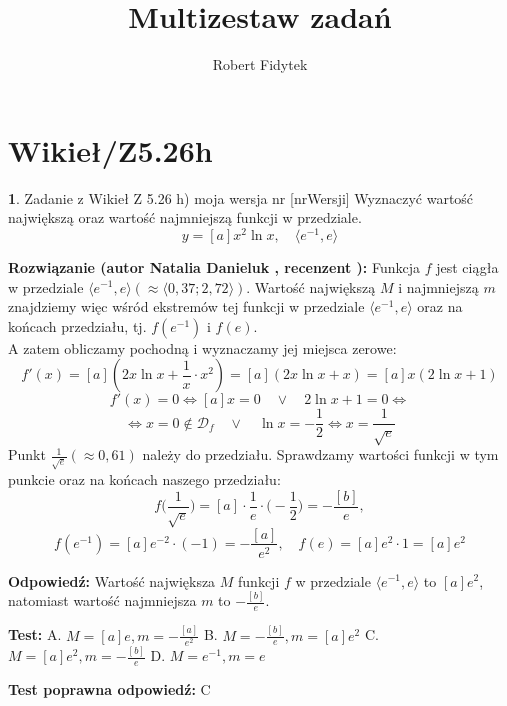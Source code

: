 \documentclass[12pt, a4paper]{article}
\title{Multizestaw zadań}
\author{Robert Fidytek}
\date{}
\theoremstyle{definition} %
\newtheorem{zad}{}
\newcommand{\kategoria}[1]{\section{#1}} %
\newcommand{\zadStart}[1]{\begin{zad}#1\newline} %
\newcommand{\zadStop}{\end{zad}}   %
\newcommand{\rozwStart}[2]{\noindent \textbf{Rozwiązanie (autor #1 , recenzent #2): }\newline} %
\newcommand{\rozwStop}{\newline}                                            %
\newcommand{\odpStart}{\noindent \textbf{Odpowiedź:}\newline}    %
\newcommand{\odpStop}{\newline}                                             %
\newcommand{\testStart}{\noindent \textbf{Test:}\newline} %
\newcommand{\testStop}{\newline} %
\newcommand{\kluczStart}{\noindent \textbf{Test poprawna odpowiedź:}\newline} %
\newcommand{\kluczStop}{\newline} %
\begin{document}
\maketitle

\kategoria{Wikieł/Z5.26h}

\zadStart{Zadanie z Wikieł Z 5.26 h) moja wersja nr [nrWersji]}
Wyznaczyć wartość największą oraz wartość najmniejszą funkcji w przedziale. 
$$y = [a]x^2 \ln x, \quad \langle e^{-1},e\rangle$$
\zadStop

\rozwStart{Natalia Danieluk}{}
Funkcja $f$ jest ciągła w przedziale $\langle e^{-1},e \rangle (\approx \langle 0,37;2,72 \rangle)$. Wartość największą $M$ i najmniejszą $m$ znajdziemy więc wśród ekstremów tej funkcji w przedziale $\langle e^{-1},e \rangle$ oraz na końcach przedziału, tj. $f(e^{-1})$ i $f(e)$. \\
A zatem obliczamy pochodną i wyznaczamy jej miejsca zerowe:
$$ f'(x) = [a](2x \ln x + \frac{1}{x} \cdot x^2) = [a](2x \ln x + x)= [a]x(2 \ln x + 1) $$
$$ f'(x) = 0 \Leftrightarrow [a]x = 0 \quad\vee\quad 2 \ln x + 1 = 0 \Leftrightarrow $$
$$ \Leftrightarrow x = 0 \notin \mathcal{D}_f\quad\vee\quad \ln x = - \frac{1}{2} \Leftrightarrow x = \frac{1}{\sqrt{e}} $$ 
Punkt $\frac{1}{\sqrt{e}} (\approx 0,61)$ należy do przedziału. Sprawdzamy wartości funkcji w tym punkcie oraz na końcach naszego przedziału: \\
$$ f\Big(\frac{1}{\sqrt{e}}\Big) = [a]\cdot\frac{1}{e}\cdot\Big(-\frac{1}{2}\Big)=-\frac{[b]}{e}, $$
$$ f(e^{-1}) = [a]e^{-2}\cdot(-1)=-\frac{[a]}{e^2},\quad f(e) = [a]e^2 \cdot 1 = [a]e^2 $$
\rozwStop

\odpStart
Wartość największa $M$ funkcji $f$ w przedziale $\langle e^{-1},e\rangle$ to $[a]e^2$, natomiast wartość najmniejsza $m$ to $-\frac{[b]}{e}$.
\odpStop

\testStart
A. $M=[a]e, m=-\frac{[a]}{e^2}$
B. $M=-\frac{[b]}{e}, m=[a]e^2$
C. $M=[a]e^2, m=-\frac{[b]}{e}$
D. $M=e^{-1}, m=e$
\testStop

\kluczStart
C
\kluczStop
\end{document}

